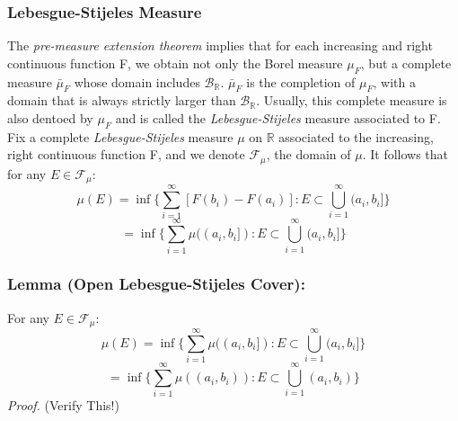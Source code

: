 \documentclass{article}
\begin{document}
\subsubsection{Lebesgue-Stijeles Measure}
The \emph{pre-measure extension theorem} implies that for each increasing and right continuous function F, we obtain not only the Borel measure $\mu_F$, but a complete measure $\bar{\mu}_F$ whose domain includes $\mathcal{B}_{\mathbb{R}}$. $\bar{\mu}_F$ is the completion of $\mu_F$, with a domain that is always strictly larger than $\mathcal{B}_{\mathbb{R}}$. Usually, this complete measure is also dentoed by $\mu_F$ and is called the \emph{Lebesgue-Stijeles} measure associated to F. \newline \newline
Fix a complete \emph{Lebesgue-Stijeles} measure $\mu$ on $\mathbb{R}$ associated to the increasing, right continuous function F, and we denote $\mathcal{F}_\mu$, the domain of $\mu$. It follows that for any $E\in \mathcal{F}_\mu$:
\[
\mu(E)=\inf\{\sum_{i=1}^{\infty}[F(b_i)-F(a_i)]:E\subset\bigcup_{i=1}^{\infty}(a_i,b_i]\}
\]
\[
=\inf\{\sum_{i=1}^{\infty}\mu((a_i,b_i]):E\subset\bigcup_{i=1}^{\infty}(a_i,b_i]\}
\]
\subsubsection{Lemma (Open Lebesgue-Stijeles Cover):}
For any $E  \in \mathcal{F}_\mu$:
\[
\mu(E) = \inf\{\sum_{i=1}^{\infty}\mu((a_i,b_i]):E\subset\bigcup_{i=1}^{\infty}(a_i,b_i]\}
\]
\[
=\inf\{\sum_{i=1}^{\infty}\mu((a_i,b_i)):E\subset\bigcup_{i=1}^{\infty}(a_i,b_i)\}
\]
\textit{Proof.}\newline \newline
(Verify This!) 
\end{document}

